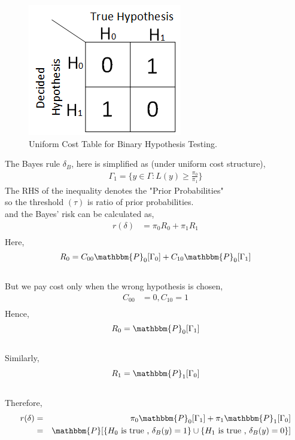 \documentclass[12pt]{report}
\begin{document}
\begin{itemize}
\begin{figure}[h]
\centering
\includegraphics[scale=0.7]{Figures/UniformCostTable}
\caption{Uniform Cost Table for Binary Hypothesis Testing.}
\label{fig:uniformcost}
\end{figure}


The Bayes rule $\delta_B$, here is simplified as (under uniform cost structure),
\begin{align*}
\Gamma_1 =\{y \in \Gamma : L(y) \geq \frac {\pi_0}{\pi_1}\}
\end{align*}
The RHS of the inequality denotes the "Prior Probabilities"\\
so the threshold $(\tau)$ is ratio of prior probabilities.\\
and the Bayes' risk can be calculated as,
\begin{eqnarray}
\nonumber
r(\delta)&= \pi_0 R_0 + \pi_1 R_1 \\
\nonumber
\end{eqnarray}
Here,
\begin{eqnarray}
 R_0 &= C_{00}  \mathbbm{P}_0[\Gamma_0]+C_{10}  \mathbbm{P}_0[\Gamma_1]\\
\nonumber
\end{eqnarray}
But we pay cost only when the wrong hypothesis is chosen, 
\begin{eqnarray}
\nonumber
C_{00}&=0,C_{10}=1\\
\nonumber
\end{eqnarray}
Hence, 
\begin{eqnarray}
\nonumber
R_0&=  \mathbbm{P}_0[\Gamma_1]\\
\nonumber
\end{eqnarray}
Similarly,
\begin{eqnarray}
\nonumber
R_1&=  \mathbbm{P}_1[\Gamma_0]\\
\nonumber
\end{eqnarray}
Therefore,
\begin{eqnarray}
\nonumber
r(\delta)&=& \pi_0  \mathbbm{P}_0[\Gamma_1]+\pi_1  \mathbbm{P}_1[\Gamma_0]\\
&=&\mathbbm{P}[\{H_0 \text{ is true , }  \delta_B(y) = 1\}  \cup \{H_1  \text{ is true , } \delta_B(y) = 0\}]
\nonumber
\end{eqnarray}



\end{itemize}
\end{document}

